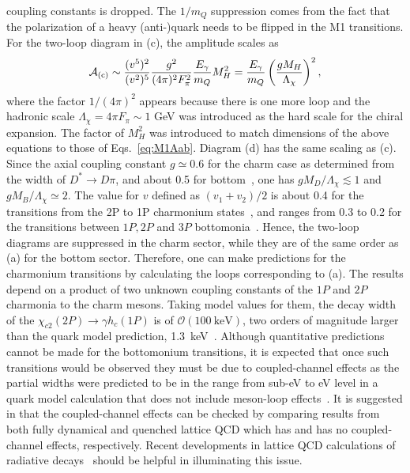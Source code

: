 coupling constants is dropped. The $1/m_Q$ suppression comes from the fact that 
the polarization of a heavy (anti-)quark needs to be flipped in the M1 
transitions. For the two-loop diagram in (c), the amplitude scales as
\begin{equation}
   \mathcal{A}_{\rm (c)} \sim \frac{(v^5)^2}{(v^2)^5}
\frac{g^2}{(4\pi)^2F_\pi^2}  \frac{E_\gamma}{m_Q} M_H^2 = \frac{E_\gamma}{m_Q}
\left(\frac{g M_H}{\Lambda_\chi}\right)^2,
\label{eq:M1Ac}
\end{equation}
where the factor $1/(4\pi)^2$ appears because there is one more loop and the
hadronic scale $\Lambda_\chi=4\pi F_\pi\sim 1$ GeV was introduced as the hard
scale for the chiral expansion. The factor of $M_H^2$ was introduced to match
dimensions of the above equations to those of Eqs.~\eqref{eq:M1Aab}. Diagram (d)
has the same scaling as (c). Since the axial coupling constant $g\simeq0.6$ for
the charm case as determined from the width of $D^*\to D\pi$, and about 0.5 for
bottom~\cite{Flynn:2015xna}, one has $g M_D/\Lambda_\chi\lesssim1$ and $g
M_B/\Lambda_\chi\simeq2$. The value for $v$ defined as $(v_1+v_2)/2$ is about
0.4 for the transitions from the 2P to 1P charmonium states~\cite{Guo:2011dv},
and ranges from 0.3 to 0.2 for the transitions between $1P,2P$ and $3P$
bottomonia~\cite{Guo:2016yxl}. Hence, the two-loop diagrams are suppressed in
the charm sector, while they are of the same order as (a) for the bottom sector.
Therefore, one can make predictions for the charmonium transitions by
calculating the loops corresponding to (a). The results depend on a product of
two unknown coupling constants of the $1P$ and $2P$ charmonia to the charm
mesons. Taking model values for them, the decay width of the
$\chi_{c2}(2P)\to\gamma h_c(1P)$ is of $\mathcal{O}(100~\text{keV})$, two orders
of magnitude larger than the quark model prediction,
1.3~keV~\cite{Barnes:2005pb}.
Although quantitative predictions cannot be made for the bottomonium
transitions, it is expected that once such transitions would be observed they
must be due to coupled-channel effects as the partial widths were predicted to
be in the range from sub-eV to eV level in a quark model calculation that does
not include meson-loop effects~\cite{Godfrey:2015dia}. It is suggested in
\cite{Guo:2011dv,Guo:2016yxl} that the coupled-channel effects can be checked by
comparing results from both fully dynamical and quenched lattice QCD which has
and has no coupled-channel effects, respectively. Recent developments in lattice
QCD calculations of radiative decays~\cite{Dudek:2006ej,Dudek:2009kk,
Shultz:2015pfa,Briceno:2016kkp,Agadjanov:2014kha,Feng:2014gba,Leskovec:2016lrm,
Meyer:2011um,Owen:2015fra} should be helpful in illuminating this issue.



